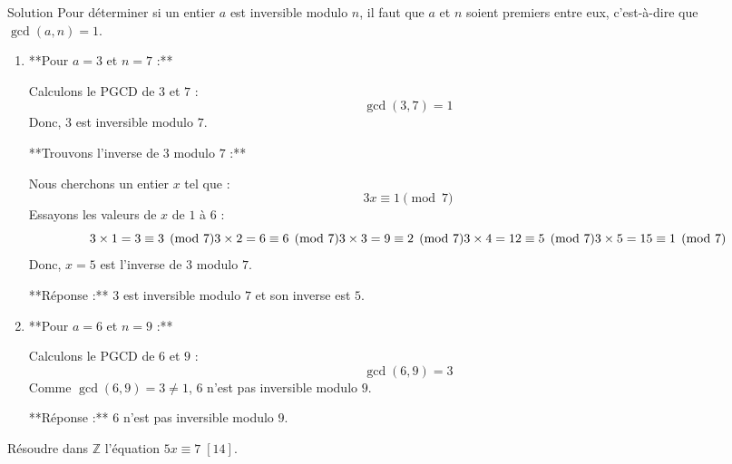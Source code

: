 \documentclass[a4paper,12pt]{article}
\begin{document}
\begin{solutionbox}{Solution}
Pour déterminer si un entier \( a \) est inversible modulo \( n \), il faut que \( a \) et \( n \) soient premiers entre eux, c’est-à-dire que \( \gcd(a, n) = 1 \).

\begin{enumerate}
    \item **Pour \( a = 3 \) et \( n = 7 \) :**
    
    Calculons le PGCD de \( 3 \) et \( 7 \) :
    \[
    \gcd(3, 7) = 1
    \]
    Donc, \( 3 \) est inversible modulo \( 7 \).
    
    **Trouvons l'inverse de \( 3 \) modulo \( 7 \) :**
    
    Nous cherchons un entier \( x \) tel que :
    \[
    3x \equiv 1 \pmod{7}
    \]
    Essayons les valeurs de \( x \) de \( 1 \) à \( 6 \) :
    \[
    3 \times 1 = 3 \equiv 3 \pmod{7} \\
    3 \times 2 = 6 \equiv 6 \pmod{7} \\
    3 \times 3 = 9 \equiv 2 \pmod{7} \\
    3 \times 4 = 12 \equiv 5 \pmod{7} \\
    3 \times 5 = 15 \equiv 1 \pmod{7}
    \]
    Donc, \( x = 5 \) est l'inverse de \( 3 \) modulo \( 7 \).
    
    **Réponse :**
    \( 3 \) est inversible modulo \( 7 \) et son inverse est \( 5 \).
    
    \item **Pour \( a = 6 \) et \( n = 9 \) :**
    
    Calculons le PGCD de \( 6 \) et \( 9 \) :
    \[
    \gcd(6, 9) = 3
    \]
    Comme \( \gcd(6, 9) = 3 \neq 1 \), \( 6 \) n'est pas inversible modulo \( 9 \).
    
    **Réponse :**
    \( 6 \) n’est pas inversible modulo \( 9 \).
\end{enumerate}
\end{solutionbox}

\begin{exercice}[title=Exercice 5 $\quad \star \star \quad$ { [Calculer] }]
Résoudre dans \( \mathbb{Z} \) l'équation \( 5x \equiv 7 \; [14] \).
\end{exercice}
\end{document}
